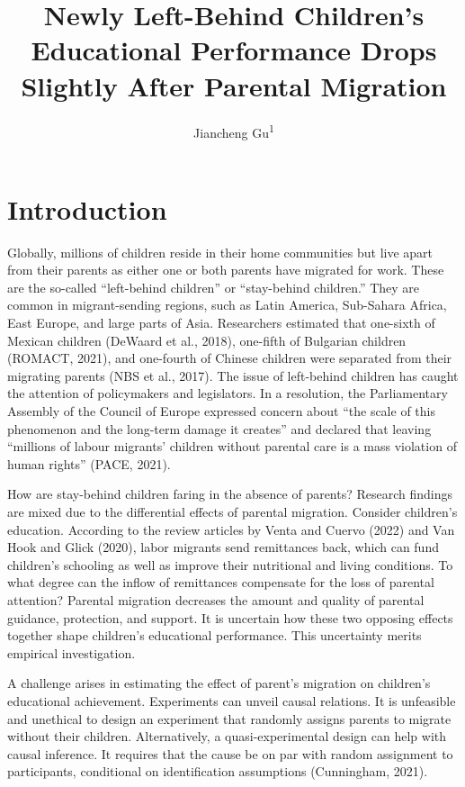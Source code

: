 \documentclass[
  man,floatsintext]{apa7}
\title{Newly Left-Behind Children's Educational Performance Drops Slightly After Parental Migration}
\author{Jiancheng Gu\textsuperscript{1}}
\date{}
\affiliation{\vspace{0.5cm}\textsuperscript{1} Faculty of Social Sciences, Vrije Universiteit Amsterdam}
\begin{document}
\maketitle

\hypertarget{introduction}{%
\section{Introduction}\label{introduction}}

Globally, millions of children reside in their home communities but live apart from their parents as either one or both parents have migrated for work. These are the so-called ``left-behind children'' or ``stay-behind children.'' They are common in migrant-sending regions, such as Latin America, Sub-Sahara Africa, East Europe, and large parts of Asia. Researchers estimated that one-sixth of Mexican children (DeWaard et al., 2018), one-fifth of Bulgarian children (ROMACT, 2021), and one-fourth of Chinese children were separated from their migrating parents (NBS et al., 2017). The issue of left-behind children has caught the attention of policymakers and legislators. In a resolution, the Parliamentary Assembly of the Council of Europe expressed concern about ``the scale of this phenomenon and the long-term damage it creates'' and declared that leaving ``millions of labour migrants' children without parental care is a mass violation of human rights'' (PACE, 2021).

How are stay-behind children faring in the absence of parents? Research findings are mixed due to the differential effects of parental migration. Consider children's education. According to the review articles by Venta and Cuervo (2022) and Van Hook and Glick (2020), labor migrants send remittances back, which can fund children's schooling as well as improve their nutritional and living conditions. To what degree can the inflow of remittances compensate for the loss of parental attention? Parental migration decreases the amount and quality of parental guidance, protection, and support. It is uncertain how these two opposing effects together shape children's educational performance. This uncertainty merits empirical investigation.

A challenge arises in estimating the effect of parent's migration on children's educational achievement. Experiments can unveil causal relations. It is unfeasible and unethical to design an experiment that randomly assigns parents to migrate without their children. Alternatively, a quasi-experimental design can help with causal inference. It requires that the cause be on par with random assignment to participants, conditional on identification assumptions (Cunningham, 2021).
\end{document}
